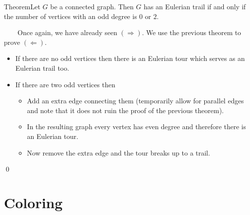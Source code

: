 \documentclass{beamer}
\def\bl[#1]#2{\begin{block}{#1}#2\end{block}}
\begin{document}
\begin{frame}
\bl[Theorem]{Let $G$ be a connected graph. Then $G$ has an Eulerian trail if and only if the number of vertices with an odd degree is $0$ or $2$.}
~~~~Once again, we have already seen $(\Rightarrow)$. We use the previous theorem to prove $(\Leftarrow)$.
\begin{itemize}
\item If there are no odd vertices then there is an Eulerian tour which serves as an Eulerian trail too. 
\item If there are two odd vertices then 
\begin{itemize}
\item Add an extra edge connecting them (temporarily allow for parallel edges and note that it does not ruin the proof of the previous theorem). 
\item In the resulting graph every vertex has even degree and therefore there is an Eulerian tour. 
\item Now remove the extra edge and the tour breaks up to a trail.
\end{itemize}
\end{itemize}\qed
\end{frame}

\section{Coloring}
\end{document}
